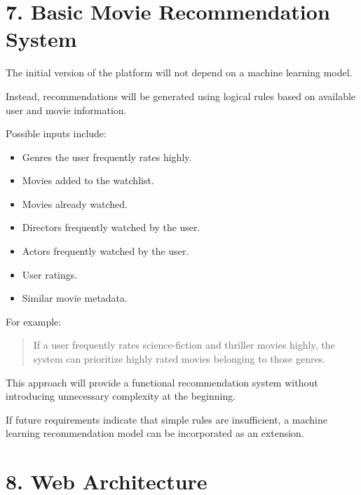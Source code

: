 \documentclass[11pt,a4paper]{article}
\begin{document}
\section{7. Basic Movie Recommendation System}

The initial version of the platform will not depend on a machine learning model.

Instead, recommendations will be generated using logical rules based on available user and movie information.

Possible inputs include:

\begin{itemize}

    \item Genres the user frequently rates highly.

    \item Movies added to the watchlist.

    \item Movies already watched.

    \item Directors frequently watched by the user.

    \item Actors frequently watched by the user.

    \item User ratings.

    \item Similar movie metadata.

\end{itemize}

For example:

\begin{quote}

If a user frequently rates science-fiction and thriller movies highly, the system can prioritize highly rated movies belonging to those genres.

\end{quote}

This approach will provide a functional recommendation system without introducing unnecessary complexity at the beginning.

If future requirements indicate that simple rules are insufficient, a machine learning recommendation model can be incorporated as an extension.



\section{8. Web Architecture}
\end{document}
